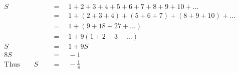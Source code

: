 \begin{align*}
S\quad&\,=\quad1+2+3+4+5+6+7+8+9+10+...\\
\,&\,=\quad1+(2+3+4)+(5+6+7)+(8+9+10)+...\\
\,&\,=\quad1+(9+18+27+...)\\
\,&\,=\quad1+9(1+2+3+...)\\
S\quad&\,=\quad1+9S\\
8S\quad&\,=\quad-1\\
\mathrm{Thus}\qquad S\quad&\,=\quad-\frac{1}{8}
\end{align*}
